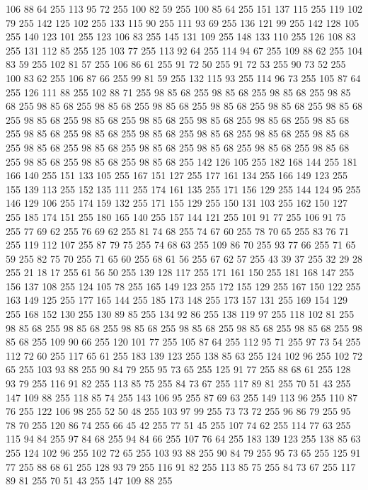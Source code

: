 106 88 64 255 113 95 72 255 100 82 59 255 100 85 64 255 151 137 115 255 119 102 79 255 142 125 102 255 133 115 90 255 111 93 69 255 136 121 99 255 142 128 105 255 140 123 101 255 123 106 83 255 145 131 109 255 148 133 110 255 126 108 83 255 131 112 85 255 125 103 77 255 113 92 64 255 114 94 67 255 109 88 62 255 104 83 59 255 102 81 57 255 106 86 61 255 91 72 50 255 91 72 53 255 90 73 52 255 100 83 62 255 106 87 66 255 99 81 59 255 132 115 93 255 114 96 73 255 105 87 64 255 126 111 88 255 102 88 71 255 98 85 68 255 98 85 68 255 98 85 68 255 98 85 68 255 98 85 68 255 98 85 68 255 98 85 68 255 98 85 68 255 98 85 68 255 98 85 68 255 98 85 68 255 98 85 68 255 98 85 68 255 98 85 68 255 98 85 68 255 98 85 68 255 98 85 68 255 98 85 68 255 98 85 68 255 98 85 68 255 98 85 68 255 98 85 68 255 98 85 68 255 98 85 68 255 98 85 68 255 98 85 68 255 98 85 68 255 98 85 68 255 98 85 68 255
98 85 68 255 98 85 68 255 142 126 105 255 182 168 144 255 181 166 140 255 151 133 105 255 167 151 127 255 177 161 134 255 166 149 123 255 155 139 113 255 152 135 111 255 174 161 135 255 171 156 129 255 144 124 95 255 146 129 106 255 174 159 132 255 171 155 129 255 150 131 103 255 162 150 127 255 185 174 151 255 180 165 140 255 157 144 121 255 101 91 77 255 106 91 75 255 77 69 62 255 76 69 62 255 81 74 68 255 74 67 60 255 78 70 65 255 83 76 71 255 119 112 107 255 87 79 75 255 74 68 63 255 109 86 70 255 93 77 66 255 71 65 59 255 82 75 70 255 71 65 60 255 68 61 56 255 67 62 57 255 43 39 37 255 32 29 28 255 21 18 17 255 61 56 50 255 139 128 117 255 171 161 150 255 181 168 147 255 156 137 108 255 124 105 78 255 165 149 123 255 172 155 129 255 167 150 122 255 163 149 125 255 177 165 144 255 185 173 148 255 173 157 131 255 169 154 129 255 168 152 130 255 130 89 85 255 134 92 86 255 138 119 97 255 118 102 81 255 98 85 68 255 98 85 68 255
98 85 68 255 98 85 68 255 98 85 68 255 98 85 68 255 98 85 68 255 109 90 66 255 120 101 77 255 105 87 64 255 112 95 71 255 97 73 54 255 112 72 60 255 117 65 61 255 183 139 123 255 138 85 63 255 124 102 96 255 102 72 65 255 103 93 88 255 90 84 79 255 95 73 65 255 125 91 77 255 88 68 61 255 128 93 79 255 116 91 82 255 113 85 75 255 84 73 67 255 117 89 81 255 70 51 43 255 147 109 88 255 118 85 74 255 143 106 95 255 87 69 63 255 149 113 96 255 110 87 76 255 122 106 98 255 52 50 48 255 103 97 99 255 73 73 72 255 96 86 79 255 95 78 70 255 120 86 74 255 66 45 42 255 77 51 45 255 107 74 62 255 114 77 63 255 115 94 84 255 97 84 68 255 94 84 66 255 107 76 64 255 183 139 123 255 138 85 63 255 124 102 96 255 102 72 65 255 103 93 88 255 90 84 79 255 95 73 65 255 125 91 77 255 88 68 61 255 128 93 79 255 116 91 82 255 113 85 75 255 84 73 67 255 117 89 81 255 70 51 43 255 147 109 88 255
